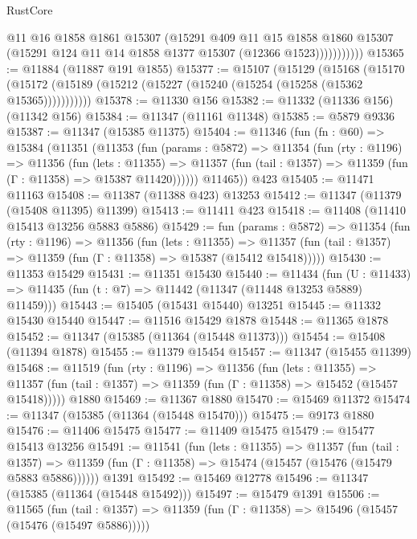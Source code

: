 \begin{lexlean}{RustCore}
\begin{coremodule}
                    @11
                    @16
                    @1858
                    @1861
                    @15307
                    (@15291
                      @409
                      @11
                      @15
                      @1858
                      @1860
                      @15307
                      (@15291 @124 @11 @14 @1858 @1377 @15307 (@12366 @1523)))))))))))
@15365 := @11884 (@11887 @191 @1855)
@15377 := @15107
    (@15129
      (@15168
        (@15170 (@15172 (@15189 (@15212 (@15227 (@15240 (@15254 (@15258 (@15362 @15365)))))))))))
@15378 := @11330 @156
@15382 := @11332 (@11336 @156) (@11342 @156)
@15384 := @11347 (@11161 @11348)
@15385 := @5879 @9336
@15387 := @11347 (@15385 @11375)
@15404 := @11346
    (fun (fn : @60) =>
    @15384
      (@11351
        (@11353
          (fun (params : @5872) =>
          @11354
            (fun (rty : @1196) =>
            @11356
              (fun (lets : @11355) =>
              @11357 (fun (tail : @1357) => @11359 (fun (Γ : @11358) => @15387 @11420))))))
        @11465))
    @423
@15405 := @11471 @11163
@15408 := @11387 (@11388 @423) @13253
@15412 := @11347 (@11379 (@15408 @11395) @11399)
@15413 := @11411 @423
@15418 := @11408 (@11410 @15413 @13256 @5883 @5886)
@15429 := fun (params : @5872) =>
  @11354
    (fun (rty : @1196) =>
    @11356
      (fun (lets : @11355) =>
      @11357 (fun (tail : @1357) => @11359 (fun (Γ : @11358) => @15387 (@15412 @15418)))))
@15430 := @11353 @15429
@15431 := @11351 @15430
@15440 := @11434
    (fun (U : @11433) => @11435 (fun (t : @7) => @11442 (@11347 (@11448 @13253 @5889) @11459)))
@15443 := @15405 (@15431 @15440) @13251
@15445 := @11332 @15430 @15440
@15447 := @11516 @15429 @1878
@15448 := @11365 @1878
@15452 := @11347 (@15385 (@11364 (@15448 @11373)))
@15454 := @15408 (@11394 @1878)
@15455 := @11379 @15454
@15457 := @11347 (@15455 @11399)
@15468 := @11519
    (fun (rty : @1196) =>
    @11356
      (fun (lets : @11355) =>
      @11357 (fun (tail : @1357) => @11359 (fun (Γ : @11358) => @15452 (@15457 @15418)))))
    @1880
@15469 := @11367 @1880
@15470 := @15469 @11372
@15474 := @11347 (@15385 (@11364 (@15448 @15470)))
@15475 := @9173 @1880
@15476 := @11406 @15475
@15477 := @11409 @15475
@15479 := @15477 @15413 @13256
@15491 := @11541
    (fun (lets : @11355) =>
    @11357
      (fun (tail : @1357) =>
      @11359 (fun (Γ : @11358) => @15474 (@15457 (@15476 (@15479 @5883 @5886))))))
    @1391
@15492 := @15469 @12778
@15496 := @11347 (@15385 (@11364 (@15448 @15492)))
@15497 := @15479 @1391
@15506 := @11565
    (fun (tail : @1357) => @11359 (fun (Γ : @11358) => @15496 (@15457 (@15476 (@15497 @5886)))))

\end{coremodule}
\end{lexlean}
